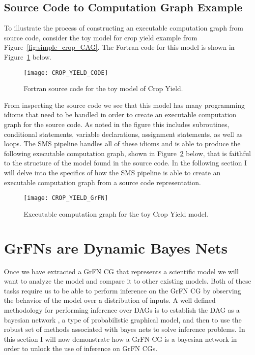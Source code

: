 \subsection{Source Code to Computation Graph Example\label{sec:code_to_grfn}}
To illustrate the process of constructing an executable computation graph from source code, consider the toy model for crop yield example from Figure~\ref{fig:simple_crop_CAG}.
The Fortran code for this model is shown in Figure~\ref{fig:crop_code} below.

\begin{figure}[!htbp]
    \label{fig:crop_code}
    \centering
    \texttt{[image: CROP\_YIELD\_CODE]}%
    \caption[Crop Yield Model Source Code]{Fortran source code for the toy model of Crop Yield.}
\end{figure}

From inspecting the source code we see that this model has many programming idioms that need to be handled in order to create an executable computation graph for the source code.
As noted in the figure this includes subroutines, conditional statements, variable declarations, assignment statements, as well as loops.
The SMS pipeline handles all of these idioms and is able to produce the following executable computation graph, shown in Figure~\ref{fig:crop_grfn_cg} below, that is faithful to the structure of the model found in the source code. In the following section I will delve into the specifics of how the SMS pipeline is able to create an executable computation graph from a source code representation.

\begin{figure}[!htbp]
    \label{fig:crop_grfn_cg}
    \centering
    \texttt{[image: CROP\_YIELD\_GrFN]}%
    \caption[Crop Yield Model GrFN CG]{Executable computation graph for the toy Crop Yield model.}
\end{figure}


\section{GrFNs are Dynamic Bayes Nets\label{sec:grfn_as_dbn}}
Once we have extracted a GrFN CG that represents a scientific model we will want to analyze the model and compare it to other existing models.
Both of these tasks require us to be able to perform inference on the GrFN CG by observing the behavior of the model over a distribution of inputs.
A well defined methodology for performing inference over DAGs is to establish the DAG as a bayesian network \citep{bishop2006pattern}, a type of probabilistic graphical model, and then to use the robust set of methods associated with bayes nets to solve inference problems.
In this section I will now demonstrate how a GrFN CG is a bayesian network in order to unlock the use of inference on GrFN CGs.

